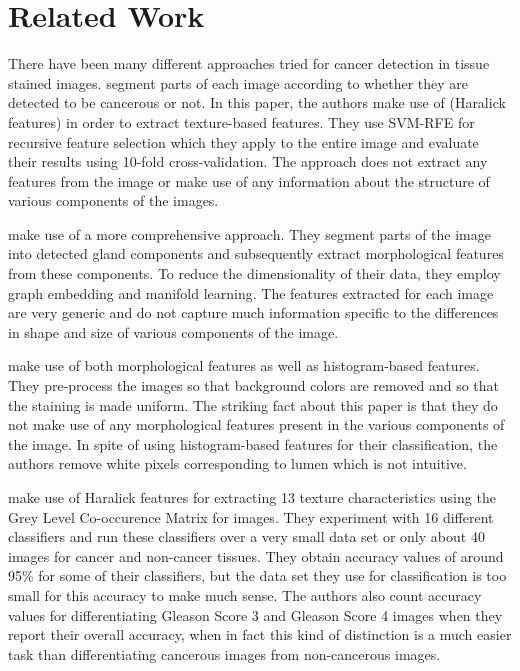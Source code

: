 \section{Related Work}
There have been many different approaches tried for cancer detection in tissue stained images. \cite{automatic} segment parts of each image according to whether they are detected to be cancerous or not. In this paper, the authors make use of (Haralick features) in order to extract texture-based features. They use SVM-RFE for recursive feature selection which they apply to the entire image and evaluate their results using 10-fold cross-validation. The approach does not extract any features from the image or make use of any information about the structure of various components of the images. 

\cite{naik2007gland} make use of a more comprehensive approach. They segment parts of the image into detected gland components and subsequently extract morphological features from these components. To reduce the dimensionality of their data, they employ graph embedding and manifold learning. The features extracted for each image are very generic and do not capture much information specific to the differences in shape and size of various components of the image.

\cite{tabesh2007multifeature} make use of both morphological features as well as histogram-based features. They pre-process the images so that background colors are removed and so that the staining is made uniform. The striking fact about this paper is that they do not make use of any morphological features present in the various components of the image. In spite of using histogram-based features for their classification, the authors remove white pixels corresponding to lumen which is not intuitive. 

\cite{alexandratou2010evaluation} make use of Haralick features for extracting 13 texture characteristics using the Grey Level Co-occurence Matrix for images. They experiment with 16 different classifiers and run these classifiers over a very small data set or only about 40 images for cancer and non-cancer tissues. They obtain accuracy values of around 95\% for some of their classifiers, but the data set they use for classification is too small for this accuracy to make much sense. The authors also count accuracy values for differentiating Gleason Score 3 and Gleason Score 4 images when they report their overall accuracy, when in fact this kind of distinction is a much easier task than differentiating cancerous images from non-cancerous images.

